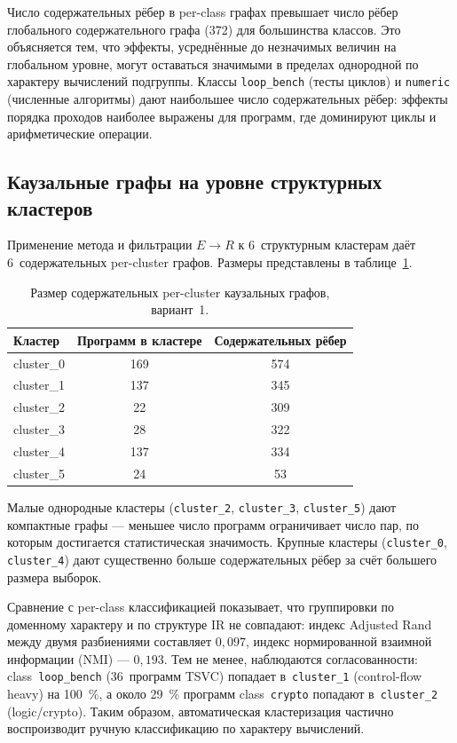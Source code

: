 Число содержательных рёбер в per-class графах превышает число рёбер глобального содержательного графа (372) для большинства классов. Это объясняется тем, что эффекты, усреднённые до незначимых величин на глобальном уровне, могут оставаться значимыми в пределах однородной по характеру вычислений подгруппы. Классы \texttt{loop\_bench} (тесты циклов) и \texttt{numeric} (численные алгоритмы) дают наибольшее число содержательных рёбер: эффекты порядка проходов наиболее выражены для программ, где доминируют циклы и арифметические операции.

\subsection{Каузальные графы на уровне структурных кластеров}

Применение метода и фильтрации $E \to R$ к 6~структурным кластерам даёт 6~содержательных per-cluster графов. Размеры представлены в таблице~\ref{tab:per_cluster}.

\begin{table}[h]
\centering
\caption{Размер содержательных per-cluster каузальных графов, вариант~1.}
\label{tab:per_cluster}
\begin{tabular}{lcc}
\hline
Кластер & Программ в кластере & Содержательных рёбер \\
\hline
cluster\_0 & 169 & 574 \\
cluster\_1 & 137 & 345 \\
cluster\_2 & 22  & 309 \\
cluster\_3 & 28  & 322 \\
cluster\_4 & 137 & 334 \\
cluster\_5 & 24  & 53  \\
\hline
\end{tabular}
\end{table}

Малые однородные кластеры (\texttt{cluster\_2}, \texttt{cluster\_3}, \texttt{cluster\_5}) дают компактные графы --- меньшее число программ ограничивает число пар, по которым достигается статистическая значимость. Крупные кластеры (\texttt{cluster\_0}, \texttt{cluster\_4}) дают существенно больше содержательных рёбер за счёт большего размера выборок.

Сравнение с per-class классификацией показывает, что группировки по доменному характеру и по структуре IR не совпадают: индекс Adjusted Rand между двумя разбиениями составляет $0{,}097$, индекс нормированной взаимной информации (NMI) --- $0{,}193$. Тем не менее, наблюдаются согласованности: class~\texttt{loop\_bench} (36~программ TSVC) попадает в~\texttt{cluster\_1} (control-flow heavy) на 100~\%, а около 29~\% программ class~\texttt{crypto} попадают в~\texttt{cluster\_2} (logic/crypto). Таким образом, автоматическая кластеризация частично воспроизводит ручную классификацию по характеру вычислений.

